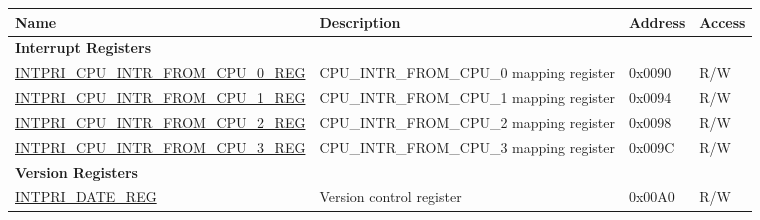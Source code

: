 \begin{longtable}{ | p{6cm} | p{7.2cm} | p{1.3cm} | p{1cm} | }
\hline\rowcolor{lightgray}
Name & Description &  Address & Access \\ \hline
\endhead
\multicolumn{4}{|l|}{\textbf{Interrupt Registers}} \\ \hline
\hyperref[regdesc:INTPRICPUINTRFROMCPUNREG]{INTPRI\_CPU\_INTR\_FROM\_CPU\_0\_REG} & CPU\_INTR\_FROM\_CPU\_0 mapping register & 0x0090 & R/W \\ \hline
\hyperref[regdesc:INTPRICPUINTRFROMCPUNREG]{INTPRI\_CPU\_INTR\_FROM\_CPU\_1\_REG} & CPU\_INTR\_FROM\_CPU\_1 mapping register & 0x0094 & R/W \\ \hline
\hyperref[regdesc:INTPRICPUINTRFROMCPUNREG]{INTPRI\_CPU\_INTR\_FROM\_CPU\_2\_REG} & CPU\_INTR\_FROM\_CPU\_2 mapping register & 0x0098 & R/W \\ \hline
\hyperref[regdesc:INTPRICPUINTRFROMCPUNREG]{INTPRI\_CPU\_INTR\_FROM\_CPU\_3\_REG} & CPU\_INTR\_FROM\_CPU\_3 mapping register & 0x009C & R/W \\ \hline
\multicolumn{4}{|l|}{\textbf{Version Registers}} \\ \hline
\hyperref[regdesc:INTPRIDATEREG]{INTPRI\_DATE\_REG} & Version control register & 0x00A0 & R/W \\ \hline
\end{longtable}

